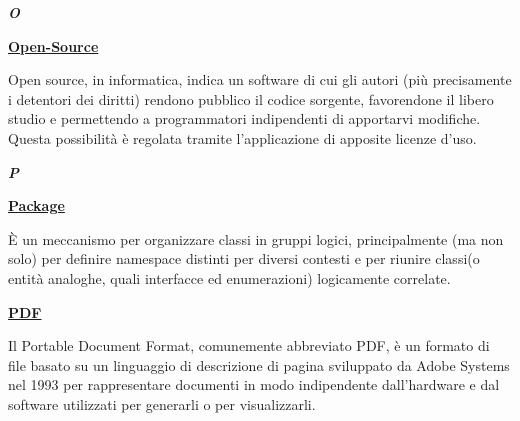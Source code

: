 	
\newpage

\cleardoublepage
{}
{}
\noindent\hrulefill\hspace{4mm}\textbf{\textsl{\Huge{O}}}\hspace{4mm}\hrulefill

\vspace*{2\bigskipamount}

\begin{addmargin}[0em]{0em}	
	\textbf{\underline{Open-Source}} 
\end{addmargin}
	
\medskip
\begin{addmargin}[5em]{1em}	
Open source, in informatica, indica un software di cui gli autori (più precisamente i detentori dei diritti) rendono pubblico il codice sorgente, favorendone il libero studio e permettendo a programmatori indipendenti di apportarvi modifiche. Questa possibilità è regolata tramite l'applicazione di apposite licenze d'uso.	
\end{addmargin}	
	
\newpage

\cleardoublepage
{}
{}
\noindent\hrulefill\hspace{4mm}\textbf{\textsl{\Huge{P}}}\hspace{4mm}\hrulefill

\vspace*{2\bigskipamount}

\begin{addmargin}[0em]{0em}	
	\textbf{\underline{Package}} 
\end{addmargin}

\medskip
\begin{addmargin}[5em]{1em}	
È un meccanismo per organizzare classi in gruppi logici, principalmente (ma non solo) per definire namespace distinti per diversi contesti e per riunire classi(o entità analoghe, quali interfacce ed enumerazioni) logicamente correlate.
\end{addmargin}	

\bigskip

\begin{addmargin}[0em]{0em}	
	\textbf{\underline{PDF}} 
\end{addmargin}

\medskip
\begin{addmargin}[5em]{1em}	
Il Portable Document Format, comunemente abbreviato PDF, è un formato di file basato su un linguaggio di descrizione di pagina sviluppato da Adobe Systems nel 1993 per rappresentare documenti in modo indipendente dall'hardware e dal software utilizzati per generarli o per visualizzarli.
\end{addmargin}	

